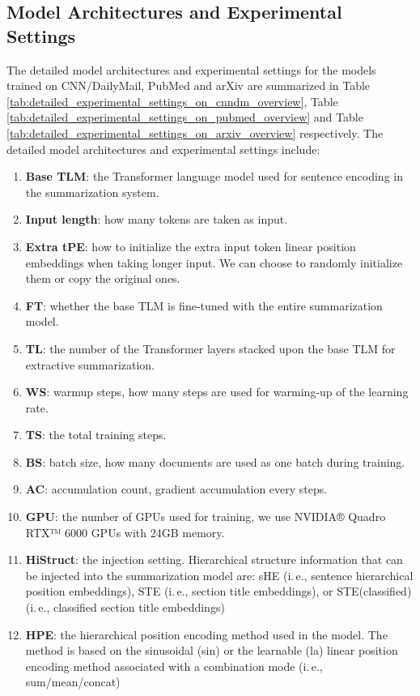 \documentclass[11pt]{article}
\begin{document}
\subsection{Model Architectures  and Experimental Settings}
\label{subsec:Experimental settings}
The detailed model architectures and experimental settings for the models trained on CNN/DailyMail, PubMed and arXiv are summarized in Table \ref{tab:detailed_experimental_settings_on_cnndm_overview}, Table \ref{tab:detailed_experimental_settings_on_pubmed_overview} and Table \ref{tab:detailed_experimental_settings_on_arxiv_overview} respectively. 
The detailed model architectures and experimental settings include:
\begin{enumerate}[leftmargin=0pt,itemsep=0pt,parsep=0pt]
 \item[] \textbf{Base TLM}: the Transformer language model used for sentence encoding in the summarization system.
 \item[] \textbf{Input length}: how many tokens are taken as input.
 \item[] \textbf{Extra tPE}: how to initialize the extra input token linear position embeddings when taking longer input. We can choose to randomly initialize them or copy the original ones.
 \item[] \textbf{FT}: whether the base TLM is fine-tuned with the entire summarization model.
 \item[] \textbf{TL}: the number of the Transformer layers stacked upon the base TLM for extractive summarization.
 \item[] \textbf{WS}: warmup steps, how many steps are used for warming-up of the learning rate.
 \item[] \textbf{TS}: the total training steps.
 \item[] \textbf{BS}: batch size, how many documents are used as one batch during training.
 \item[] \textbf{AC}: accumulation count, gradient accumulation every  steps.
 \item[] \textbf{GPU}: the number of GPUs used for training, we use NVIDIA® Quadro RTX™ 6000 GPUs with 24GB memory.
 \item[] \textbf{HiStruct}: the injection setting. Hierarchical structure information that can be injected into the summarization model are: sHE (i.\,e., sentence hierarchical position embeddings), STE (i.\,e., section title embeddings), or  STE(classified) (i.\,e., classified section title embeddings)
 \item[] \textbf{HPE}: the hierarchical position encoding method used in the model. The method is based on the sinusoidal (sin) or the learnable (la) linear position encoding method associated with a combination mode (i.\,e., sum/mean/concat)

\end{enumerate}
\end{document}
